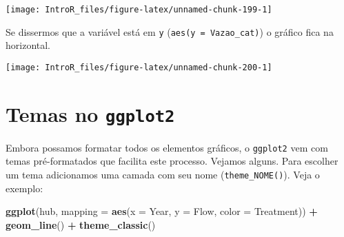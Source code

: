 \documentclass[
]{book}
\newenvironment{Shaded}{\begin{snugshade}}{\end{snugshade}}
\newcommand{\DataTypeTok}[1]{\textcolor[rgb]{0.13,0.29,0.53}{#1}}
\newcommand{\KeywordTok}[1]{\textcolor[rgb]{0.13,0.29,0.53}{\textbf{#1}}}
\newcommand{\NormalTok}[1]{#1}
\newcommand{\OperatorTok}[1]{\textcolor[rgb]{0.81,0.36,0.00}{\textbf{#1}}}
\newcommand{\StringTok}[1]{\textcolor[rgb]{0.31,0.60,0.02}{#1}}
\begin{document}
\begin{center}\texttt{[image: IntroR\_files/figure-latex/unnamed-chunk-199-1]} \end{center}

Se dissermos que a variável está em \texttt{y} (\texttt{aes(y\ =\ Vazao\_cat)}) o gráfico fica na horizontal.

\begin{Shaded}
\end{Shaded}

\begin{center}\texttt{[image: IntroR\_files/figure-latex/unnamed-chunk-200-1]} \end{center}

\hypertarget{temas-no-ggplot2}{%
\section{\texorpdfstring{Temas no \texttt{ggplot2}}{Temas no ggplot2}}\label{temas-no-ggplot2}}

Embora possamos formatar todos os elementos gráficos, o \texttt{ggplot2} vem com temas pré-formatados que facilita este processo. Vejamos alguns. Para escolher um tema adicionamos uma camada com seu nome (\texttt{theme\_NOME()}). Veja o exemplo:

\begin{Shaded}
\begin{Highlighting}[]
\KeywordTok{ggplot}\NormalTok{(hub, }\DataTypeTok{mapping =} \KeywordTok{aes}\NormalTok{(}\DataTypeTok{x =}\NormalTok{ Year, }\DataTypeTok{y =}\NormalTok{ Flow, }\DataTypeTok{color =}\NormalTok{ Treatment)) }\OperatorTok{+}
\StringTok{  }\KeywordTok{geom_line}\NormalTok{() }\OperatorTok{+}
\StringTok{  }\KeywordTok{theme_classic}\NormalTok{()}
\end{Highlighting}
\end{Shaded}
\end{document}
